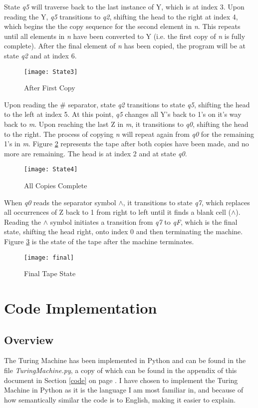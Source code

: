 \documentclass[a4paper,12pt]{article}
\begin{document}
State \textit{q5} will traverse back to the last instance of Y, which is at index 3. Upon reading the Y, \textit{q5} transitions to \textit{q2}, shifting the head to the right at index 4, which begins the the copy sequence for the second element in \textit{n}. This repeats until all elements in \textit{n} have been converted to Y (i.e. the first copy of \textit{n} is fully complete). After the final element of \textit{n} has been copied, the program will be at state \textit{q2} and at index 6.
\begin{figure}[H]
	\centering
	\texttt{[image: State3]}
	\caption{After First Copy}
	\label{fig:state3}
\end{figure}
Upon reading the \# separator, state \textit{q2} transitions to state \textit{q5}, shifting the head to the left at index 5.
At this point, \textit{q5} changes all Y's back to 1's on it's way back to \textit{m}. Upon reaching the last Z in \textit{m}, it transitions to \textit{q0}, shifting the head to the right. The process of copying \textit{n} will repeat again from \textit{q0} for the remaining 1's in \textit{m}. Figure \ref{fig:state4} represents the tape after both copies have been made, and no more are remaining. The head is at index 2 and at state \textit{q0}.
\begin{figure}[H]
	\centering
	\texttt{[image: State4]}
	\caption{All Copies Complete}
	\label{fig:state4}
\end{figure}
When \textit{q0} reads the separator symbol $\land$, it transitions to state \textit{q7}, which replaces all occurrences of Z back to 1 from right to left until it finds a blank cell ($\land$). Reading the $\land$ symbol initiates a transition from \textit{q7} to \textit{qF}, which is the final state, shifting the head right, onto index 0 and then terminating the machine.
Figure \ref{fig:final} is the state of the tape after the machine terminates.
\begin{figure}[H]
	\centering
	\texttt{[image: final]}
	\caption{Final Tape State}
	\label{fig:final}
\end{figure}
\newpage
\section{Code Implementation}
\subsection{Overview}
The Turing Machine has been implemented in Python and can be found in the file \textit{TuringMachine.py}, a copy of which can be found in the appendix of this document in Section \ref{code} on page \pageref{code}. I have chosen to implement the Turing Machine in Python as it is the language I am most familiar in, and because of how semantically similar the code is to English, making it easier to explain.
\end{document}
